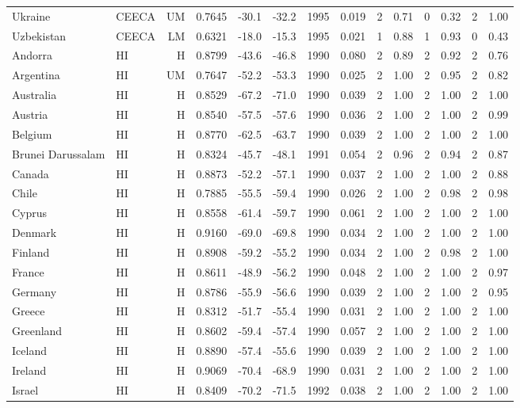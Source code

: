\begin{longtable}{llrrrrrrrrrrrr}
Ukraine & CEECA & UM & 0.7645 & -30.1 & -32.2 & 1995 & 0.019 & 2 & 0.71 & 0 & 0.32 & 2 & 1.00 \\
Uzbekistan & CEECA & LM & 0.6321 & -18.0 & -15.3 & 1995 & 0.021 & 1 & 0.88 & 1 & 0.93 & 0 & 0.43 \\
Andorra & HI & H & 0.8799 & -43.6 & -46.8 & 1990 & 0.080 & 2 & 0.89 & 2 & 0.92 & 2 & 0.76 \\
Argentina & HI & UM & 0.7647 & -52.2 & -53.3 & 1990 & 0.025 & 2 & 1.00 & 2 & 0.95 & 2 & 0.82 \\
Australia & HI & H & 0.8529 & -67.2 & -71.0 & 1990 & 0.039 & 2 & 1.00 & 2 & 1.00 & 2 & 1.00 \\
Austria & HI & H & 0.8540 & -57.5 & -57.6 & 1990 & 0.036 & 2 & 1.00 & 2 & 1.00 & 2 & 0.99 \\
Belgium & HI & H & 0.8770 & -62.5 & -63.7 & 1990 & 0.039 & 2 & 1.00 & 2 & 1.00 & 2 & 1.00 \\
Brunei Darussalam & HI & H & 0.8324 & -45.7 & -48.1 & 1991 & 0.054 & 2 & 0.96 & 2 & 0.94 & 2 & 0.87 \\
Canada & HI & H & 0.8873 & -52.2 & -57.1 & 1990 & 0.037 & 2 & 1.00 & 2 & 1.00 & 2 & 0.88 \\
Chile & HI & H & 0.7885 & -55.5 & -59.4 & 1990 & 0.026 & 2 & 1.00 & 2 & 0.98 & 2 & 0.98 \\
Cyprus & HI & H & 0.8558 & -61.4 & -59.7 & 1990 & 0.061 & 2 & 1.00 & 2 & 1.00 & 2 & 1.00 \\
Denmark & HI & H & 0.9160 & -69.0 & -69.8 & 1990 & 0.034 & 2 & 1.00 & 2 & 1.00 & 2 & 1.00 \\
Finland & HI & H & 0.8908 & -59.2 & -55.2 & 1990 & 0.034 & 2 & 1.00 & 2 & 0.98 & 2 & 1.00 \\
France & HI & H & 0.8611 & -48.9 & -56.2 & 1990 & 0.048 & 2 & 1.00 & 2 & 1.00 & 2 & 0.97 \\
Germany & HI & H & 0.8786 & -55.9 & -56.6 & 1990 & 0.039 & 2 & 1.00 & 2 & 1.00 & 2 & 0.95 \\
Greece & HI & H & 0.8312 & -51.7 & -55.4 & 1990 & 0.031 & 2 & 1.00 & 2 & 1.00 & 2 & 1.00 \\
Greenland & HI & H & 0.8602 & -59.4 & -57.4 & 1990 & 0.057 & 2 & 1.00 & 2 & 1.00 & 2 & 1.00 \\
Iceland & HI & H & 0.8890 & -57.4 & -55.6 & 1990 & 0.039 & 2 & 1.00 & 2 & 1.00 & 2 & 1.00 \\
Ireland & HI & H & 0.9069 & -70.4 & -68.9 & 1990 & 0.031 & 2 & 1.00 & 2 & 1.00 & 2 & 1.00 \\
Israel & HI & H & 0.8409 & -70.2 & -71.5 & 1992 & 0.038 & 2 & 1.00 & 2 & 1.00 & 2 & 1.00 \\

\end{longtable}

